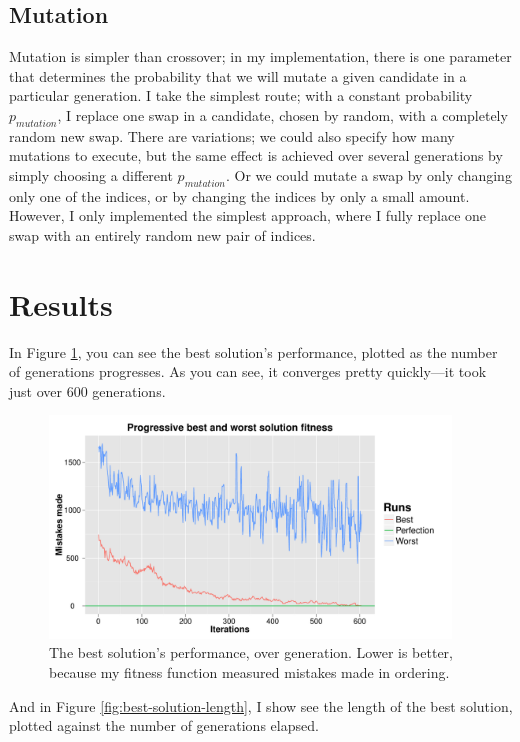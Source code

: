 \documentclass[11pt]{article}
\begin{document}
\subsection{Mutation}
Mutation is simpler than crossover; in my implementation, there is one parameter that determines the probability that we will mutate a given candidate in a particular generation. I take the simplest route; with a constant probability $p_{mutation}$, I replace one swap in a candidate, chosen by random, with a completely random new swap. There are variations; we could also specify how many mutations to execute, but the same effect is achieved over several generations by simply choosing a different $p_{mutation}$. Or we could mutate a swap by only changing only one of the indices, or by changing the indices by only a small amount. However, I only implemented the simplest approach, where I fully replace one swap with an entirely random new pair of indices.

\section{Results}

In Figure \ref{fig:best-solution-performance}, you can see the best solution's performance, plotted as the number of generations progresses. As you can see, it converges pretty quickly---it took just over 600 generations.

\begin{figure}[H]
  \centering
  \includegraphics[width=0.95\textwidth]{results/output-i600-fitness.pdf}
  \caption{The best solution's performance, over generation. Lower is better, because my fitness function measured mistakes made in ordering.}
  \label{fig:best-solution-performance}
\end{figure}

\noindent
And in Figure \ref{fig:best-solution-length}, I show see the length of the best solution, plotted against the number of generations elapsed.
\end{document}
